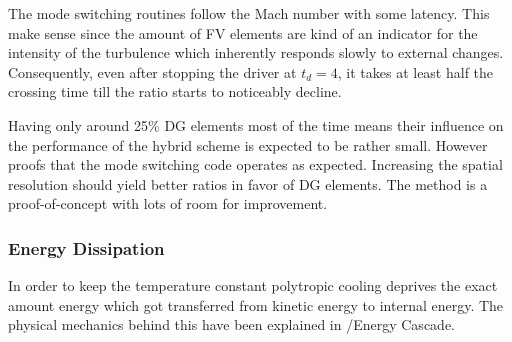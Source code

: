The mode switching routines follow the Mach number with some latency. This make
sense since the amount of FV elements are kind of an indicator for the
intensity of the turbulence which inherently responds slowly to external
changes. Consequently, even after stopping the driver at $t_d = 4$, it takes at
least half the crossing time till the ratio starts to noticeably decline.

Having only around 25\% DG elements most of the time means their influence on
the performance of the hybrid scheme is expected to be rather small.  However
 proofs that the mode switching
code operates as expected. Increasing the spatial resolution should yield
better ratios in favor of DG elements. The method is a proof-of-concept with
lots of room for improvement.


\newpage

\subsubsection{Energy Dissipation}
\label{sec:stirturb-energy-dissipation}
In order to keep the temperature constant polytropic cooling deprives the exact
amount energy which got transferred from kinetic energy to internal energy. The
physical mechanics behind this have been explained in /Energy
Cascade.

